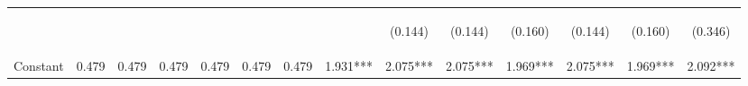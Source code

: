 \begin{center}
\begin{tabular}{lccccccccccccc}
\vspace{4pt} & \begin{footnotesize}\end{footnotesize} & \begin{footnotesize}\end{footnotesize} & \begin{footnotesize}\end{footnotesize} & \begin{footnotesize}\end{footnotesize} & \begin{footnotesize}\end{footnotesize} & \begin{footnotesize}\end{footnotesize} & \begin{footnotesize}\end{footnotesize} & \begin{footnotesize}(0.144)\end{footnotesize} & \begin{footnotesize}(0.144)\end{footnotesize} & \begin{footnotesize}(0.160)\end{footnotesize} & \begin{footnotesize}(0.144)\end{footnotesize} & \begin{footnotesize}(0.160)\end{footnotesize} & \begin{footnotesize}(0.346)\end{footnotesize} \\
Constant & 0.479 & 0.479 & 0.479 & 0.479 & 0.479 & 0.479 & 1.931*** & 2.075*** & 2.075*** & 1.969*** & 2.075*** & 1.969*** & 2.092*** \\

\end{tabular}
\end{center}
